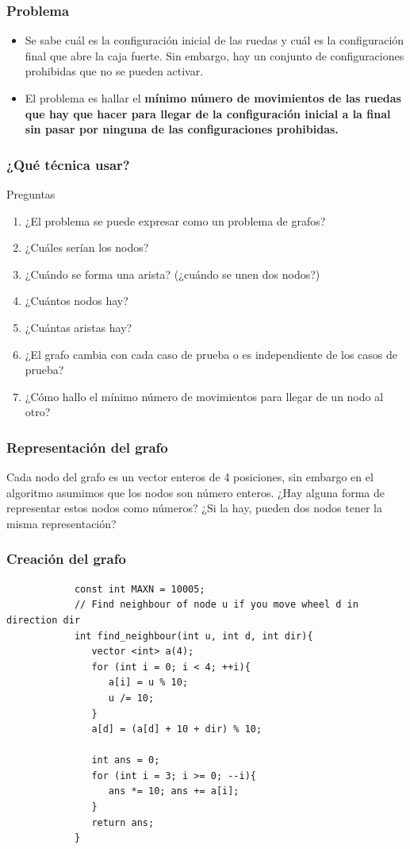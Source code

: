 \documentclass{beamer}
\begin{document}
	\begin{frame}
		\frametitle{Problema}
		\begin{itemize}
			\item Se sabe cuál es la configuración inicial de las ruedas y cuál es la configuración final que abre la caja fuerte. Sin embargo, hay un conjunto de configuraciones prohibidas que no se pueden activar.\\
			\item El problema es hallar el \textbf{mínimo número de movimientos de las ruedas que hay que hacer para llegar de la configuración inicial a la final sin pasar por ninguna de las configuraciones prohibidas.}
		\end{itemize}
	\end{frame}
	
	\begin{frame}
		\frametitle{¿Qué técnica usar?}
		\begin{alertblock}{Preguntas}
			\begin{enumerate}
				\item ¿El problema se puede expresar como un problema de grafos? \pause
				\item ¿Cuáles serían los nodos? \pause
				\item ¿Cuándo se forma una arista? (¿cuándo se unen dos nodos?) \pause
				\item ¿Cuántos nodos hay? \pause
				\item ¿Cuántas aristas hay? \pause
				\item ¿El grafo cambia con cada caso de prueba o es independiente de los casos de prueba? \pause
				\item ¿Cómo hallo el mínimo número de movimientos para llegar de un nodo al otro?
			\end{enumerate}
		\end{alertblock}
	\end{frame}
	
	\begin{frame}
		\frametitle{Representación del grafo}
		Cada nodo del grafo es un vector enteros de 4 posiciones, sin embargo en el algoritmo asumimos que los nodos son número enteros. ¿Hay alguna forma de representar estos nodos como números? ¿Si la hay, pueden dos nodos tener la misma representación?
	\end{frame}
	
	\begin{frame}[fragile]
		\frametitle{Creación del grafo}
		\begin{lstlisting}
			const int MAXN = 10005;
			// Find neighbour of node u if you move wheel d in direction dir
			int find_neighbour(int u, int d, int dir){
			   vector <int> a(4);
			   for (int i = 0; i < 4; ++i){
			      a[i] = u % 10;
			      u /= 10;
			   }
			   a[d] = (a[d] + 10 + dir) % 10;

			   int ans = 0;
			   for (int i = 3; i >= 0; --i){
			      ans *= 10; ans += a[i];
			   }
			   return ans;
			}
		\end{lstlisting}
	\end{frame}
	
\end{document}

